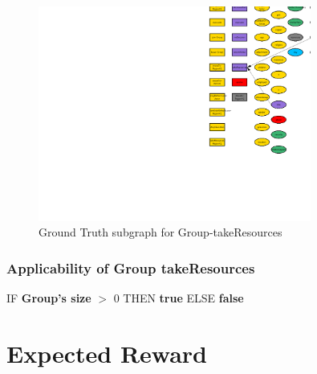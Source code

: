 \documentclass{article}%
\begin{document}
\begin{figure}[ht]%
\centering%
\includegraphics[width=0.8\textwidth]{images/Group-takeResources.png}%
\caption{Ground Truth subgraph for Group{-}takeResources}%
\end{figure}

%
\subsubsection{Applicability of Group takeResources}%
\label{ssubsec:Applicability of Group takeResources}%
\begin{flushleft}%
IF %
\textbf{Group's size}%
$>$%
0%
\linebreak%
\hspace*{2em}%
THEN %
\textbf{true}%
\linebreak%
\hspace*{2em}%
ELSE %
\textbf{false}%
\end{flushleft}

%
\section{Expected Reward}%
\label{sec:Expected Reward}%

%
\end{document}
